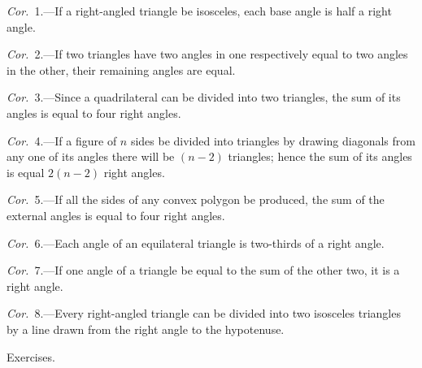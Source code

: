 \documentclass[oneside]{book}
\newcommand\exhead[1]{
\Needspace*{5\baselineskip}\begin{center}
\textsf{#1}
\end{center}
}
\begin{document}
\emph{Cor.}~1.---If a right-angled triangle be isosceles, each
base angle is half a right angle.

\emph{Cor.}~2.---If two triangles have two angles in one
respectively equal to two angles in the other, their
remaining angles are equal.

\emph{Cor.}~3.---Since a quadrilateral can be divided into
two triangles, the sum of its angles is equal to four
right angles.

\emph{Cor.}~4.---If a figure of $n$ sides be divided into triangles
by drawing diagonals from any one of its angles
there will be $(n-2)$ triangles; hence the sum of its
angles is equal $2(n-2)$ right angles.

\emph{Cor.}~5.---If all the sides of any convex polygon be
produced, the sum of the external angles is equal to
four right angles.

\emph{Cor.}~6.---Each angle of an equilateral triangle is
two-thirds of a right angle.

\emph{Cor.}~7.---If one angle of a triangle be equal to the
sum of the other two, it is a right angle.

\emph{Cor.}~8.---Every right-angled triangle can be divided
into two isosceles triangles by a line drawn from the
right angle to the hypotenuse.


\exhead{Exercises.}
\end{document}
